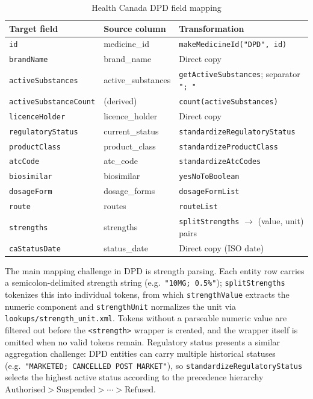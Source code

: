 \documentclass[a4paper,oneside,bibliography=totoc]{scrbook}
\begin{document}
\begin{table}[htbp]
\centering
\caption{Health Canada DPD field mapping}
\label{tab:dpd_mapping}
\scriptsize
\begin{tabular}{|l|l|l|}
\hline
\textbf{Target field} & \textbf{Source column} & \textbf{Transformation} \\
\hline
\texttt{id}                   & medicine\_id          & \texttt{makeMedicineId("DPD", id)} \\
\texttt{brandName}            & brand\_name           & Direct copy \\
\texttt{activeSubstances}     & active\_substances    & \texttt{getActiveSubstances}; separator \texttt{"; "} \\
\texttt{activeSubstanceCount} & (derived)             & \texttt{count(activeSubstances)} \\
\texttt{licenceHolder}        & licence\_holder       & Direct copy \\
\texttt{regulatoryStatus}     & current\_status       & \texttt{standardizeRegulatoryStatus} \\
\texttt{productClass}         & product\_class        & \texttt{standardizeProductClass} \\
\texttt{atcCode}              & atc\_code             & \texttt{standardizeAtcCodes} \\
\texttt{biosimilar}           & biosimilar            & \texttt{yesNoToBoolean} \\
\texttt{dosageForm}           & dosage\_forms         & \texttt{dosageFormList} \\
\texttt{route}                & routes                & \texttt{routeList} \\
\texttt{strengths}            & strengths             & \texttt{splitStrengths} $\rightarrow$ (value, unit) pairs \\
\texttt{caStatusDate}         & status\_date          & Direct copy (ISO date) \\
\hline
\end{tabular}
\end{table}

The main mapping challenge in DPD is strength parsing. Each entity row
carries a semicolon-delimited strength string (e.g.\
\texttt{"10MG; 0.5\%"}); \texttt{splitStrengths} tokenizes this into
individual tokens, from which \texttt{strengthValue} extracts the numeric
component and \texttt{strengthUnit} normalizes the unit via
\texttt{lookups/strength\_unit.xml}. Tokens without a parseable numeric
value are filtered out before the \texttt{<strength>} wrapper is created,
and the wrapper itself is omitted when no valid tokens remain. Regulatory
status presents a similar aggregation challenge: DPD entities can carry
multiple historical statuses (e.g.\ \texttt{"MARKETED; CANCELLED POST
MARKET"}), so \texttt{standardizeRegulatoryStatus} selects the highest
active status according to the precedence hierarchy
$\text{Authorised} > \text{Suspended} > \cdots > \text{Refused}$.
\end{document}
